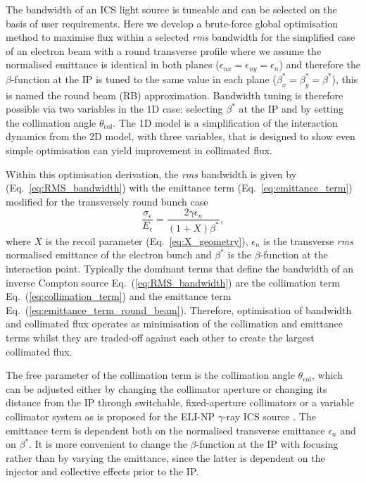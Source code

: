 \documentclass[../main.tex]{subfiles}
\begin{document}
The bandwidth of an ICS light source is tuneable and can be selected on the basis of user requirements. Here we develop a brute-force global optimisation method to maximise flux within a selected \textit{rms} bandwidth for the simplified case of an electron beam with a round transverse profile where we assume the normalised emittance is identical in both planes ($\epsilon_{nx} = \epsilon_{ny} = \epsilon_{n}$) and therefore the $\beta$-function at the IP is tuned to the same value in each plane ($\beta_{x}^{*} = \beta_{y}^{*} = \beta^{*}$), this is named the round beam (RB) approximation. Bandwidth tuning is therefore possible via two variables in the 1D case: selecting $\beta^{*}$ at the IP and by setting the collimation angle $\theta_{\mathrm{col}}$. The 1D model is a simplification of the interaction dynamics from the 2D model, with three variables, that is designed to show even simple optimisation can yield improvement in collimated flux.

Within this optimisation derivation, the \textit{rms} bandwidth is given by (Eq.~\ref{eq:RMS_bandwidth}) with the emittance term (Eq.~\ref{eq:emittance_term}) modified for the transversely round bunch case
\begin{equation}
\frac{\sigma_{\epsilon}}{E_{\epsilon}} = \frac{2\gamma\epsilon_{n}}{\left(1+X\right)\beta^{*}},
\label{eq:emittance_term_round_beam}    
\end{equation}
where $X$ is the recoil parameter (Eq.~\ref{eq:X_geometry}), $\epsilon_{n}$ is the transverse \textit{rms} normalised emittance of the electron bunch and $\beta^{*}$ is the $\beta$-function at the interaction point. Typically the dominant terms that define the bandwidth of an inverse Compton source Eq.~(\ref{eq:RMS_bandwidth}) are the collimation term Eq.~(\ref{eq:collimation_term}) and the emittance term Eq.~(\ref{eq:emittance_term_round_beam}). Therefore, optimisation of bandwidth and collimated flux operates as minimisation of the collimation and emittance terms whilst they are traded-off against each other to create the largest collimated flux.

The free parameter of the collimation term is the collimation angle $\theta_{\mathrm{col}}$, which can be adjusted either by changing the collimator aperture or changing its distance from the IP through switchable, fixed-aperture collimators or a variable collimator system as is proposed for the ELI-NP $\gamma$-ray ICS source \cite{paterno2017collimation}. The emittance term is dependent both on the normalised transverse emittance $\epsilon_{n}$ and on $\beta^{*}$. It is more convenient to change the $\beta$-function at the IP with focusing rather than by varying the emittance, since the latter is dependent on the injector and collective effects prior to the IP. 
\end{document}

